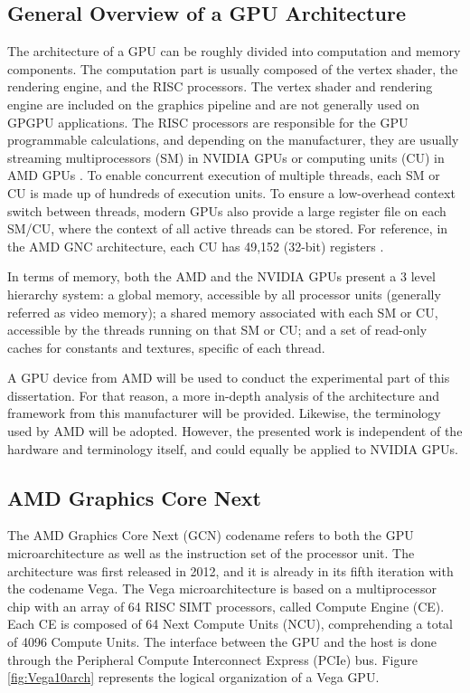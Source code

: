 \subsection{General Overview of a GPU Architecture}
The architecture of a GPU can be roughly divided into computation and memory components. The computation part is usually composed of the vertex shader, the rendering engine, and the RISC processors. The vertex shader and rendering engine are included on the graphics pipeline and are not generally used on GPGPU applications. The RISC processors are responsible for the GPU programmable calculations, and depending on the manufacturer, they are usually streaming multiprocessors (SM) in NVIDIA GPUs \cite{nvidia_cuda_2008} or computing units (CU) in AMD GPUs \cite{amd_amd_2008}.  To enable concurrent execution of multiple threads, each SM or CU is made up of hundreds of execution units. To ensure a low-overhead context switch between threads, modern GPUs also provide a large register file on each SM/CU, where the context of all active threads can be stored. For reference, in the AMD GNC architecture, each CU has 49,152 (32-bit) registers \cite{jing_energy-efficient_2013}.

In terms of memory, both the AMD and the NVIDIA GPUs present a 3 level hierarchy system: a global memory, accessible by all processor units (generally referred as video memory); a shared memory associated with each SM or CU, accessible by the threads running on that SM or CU; and a set of read-only caches for constants and textures, specific of each thread.

A GPU device from AMD will be used to conduct the experimental part of this dissertation. For that reason, a more in-depth analysis of the architecture and framework from this manufacturer will be provided. Likewise, the terminology used by AMD will be adopted. However, the presented work is independent of the hardware and terminology itself, and could equally be applied to NVIDIA GPUs.

\subsection{AMD Graphics Core Next}

The AMD Graphics Core Next (GCN) \cite{amd_radeons_nodate} codename refers to both the GPU microarchitecture as well as the instruction set of the processor unit. The architecture was first released in 2012, and it is already in its fifth iteration with the codename Vega. The Vega microarchitecture is based on a multiprocessor chip with an array of 64 RISC SIMT processors, called Compute Engine (CE). Each CE is composed of 64 Next Compute Units (NCU), comprehending a total of 4096 Compute Units. The interface between the GPU and the host is done through the Peripheral Compute Interconnect Express (PCIe) bus. Figure \ref{fig:Vega10arch} represents the logical organization of a Vega GPU.  

